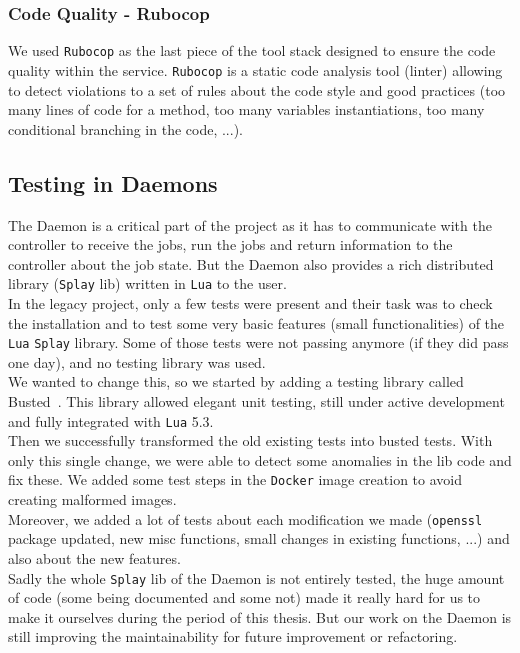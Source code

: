 \documentclass{eplmastersthesis}
\begin{document}
        \subsubsection{Code Quality - Rubocop}

          We used \texttt{Rubocop} as the last piece of the tool stack designed to ensure
          the code quality within the service. \texttt{Rubocop} is a static code analysis
          tool (linter) allowing to detect violations to a set of rules about
          the code style and good practices (too many lines of code for a method,
          too many variables instantiations, too many conditional branching
          in the code, ...).

      \subsection{Testing in Daemons}

        The Daemon is a critical part of the project as it has to communicate
        with the controller to receive the jobs, run the jobs and return
        information to the controller about the job state. But the Daemon also
        provides a rich distributed library (\texttt{Splay} lib) written in \texttt{Lua} to the user.\\
        In the legacy project, only a few tests were present and their
        task was to check the installation and to test some very basic features
        (small functionalities) of the \texttt{Lua} \texttt{Splay} library. Some of those tests
        were not passing anymore (if they did pass one day), and no testing
        library was used.\\

        We wanted to change this, so we started by adding a testing library
        called Busted~\cite{busted}. This library allowed elegant unit testing,
        still under active development and fully integrated with \texttt{Lua} 5.3.\\
        Then we successfully transformed the old existing tests into busted
        tests. With only this single change, we were able to detect some
        anomalies in the lib code and fix these. We added some test steps
        in the \texttt{Docker} image creation to avoid creating malformed images.\\

        Moreover, we added a lot of tests about each modification we made
        (\texttt{openssl} package updated, new misc functions, small changes in existing
        functions, ...) and also about the new features.\\
        Sadly the whole \texttt{Splay} lib of the Daemon is not entirely tested,
        the huge amount of code (some being documented and some not) made it
        really hard for us to make it ourselves during the period of this
        thesis. But our work on the Daemon is still improving the maintainability
        for future improvement or refactoring.
\end{document}
